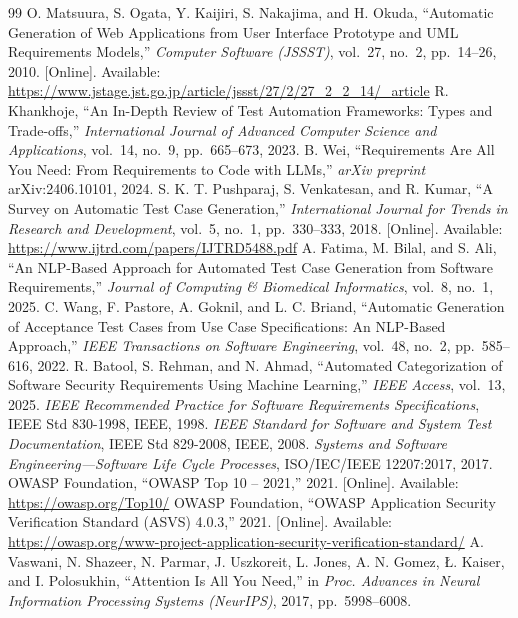 \documentclass[12pt,a4paper,oneside]{report}
\begin{document}
\begin{thebibliography}{99}
 O. Matsuura, S. Ogata, Y. Kaijiri, S. Nakajima, and H. Okuda, ``Automatic Generation of Web Applications from User Interface Prototype and UML Requirements Models,'' \emph{Computer Software (JSSST)}, vol.~27, no.~2, pp.~14--26, 2010. [Online]. Available: \url{https://www.jstage.jst.go.jp/article/jssst/27/2/27_2_2_14/_article}
 R. Khankhoje, ``An In-Depth Review of Test Automation Frameworks: Types and Trade-offs,'' \emph{International Journal of Advanced Computer Science and Applications}, vol.~14, no.~9, pp.~665--673, 2023.
 B. Wei, ``Requirements Are All You Need: From Requirements to Code with LLMs,'' \emph{arXiv preprint} arXiv:2406.10101, 2024.
 S. K. T. Pushparaj, S. Venkatesan, and R. Kumar, ``A Survey on Automatic Test Case Generation,'' \emph{International Journal for Trends in Research and Development}, vol.~5, no.~1, pp.~330--333, 2018. [Online]. Available: \url{https://www.ijtrd.com/papers/IJTRD5488.pdf}
 A. Fatima, M. Bilal, and S. Ali, ``An NLP-Based Approach for Automated Test Case Generation from Software Requirements,'' \emph{Journal of Computing \& Biomedical Informatics}, vol.~8, no.~1, 2025.
 C. Wang, F. Pastore, A. Goknil, and L. C. Briand, ``Automatic Generation of Acceptance Test Cases from Use Case Specifications: An NLP-Based Approach,'' \emph{IEEE Transactions on Software Engineering}, vol.~48, no.~2, pp.~585--616, 2022.
 R. Batool, S. Rehman, and N. Ahmad, ``Automated Categorization of Software Security Requirements Using Machine Learning,'' \emph{IEEE Access}, vol.~13, 2025.
 \emph{IEEE Recommended Practice for Software Requirements Specifications}, IEEE Std 830-1998, IEEE, 1998.
 \emph{IEEE Standard for Software and System Test Documentation}, IEEE Std 829-2008, IEEE, 2008.
 \emph{Systems and Software Engineering---Software Life Cycle Processes}, ISO/IEC/IEEE 12207:2017, 2017.
 OWASP Foundation, ``OWASP Top 10 -- 2021,'' 2021. [Online]. Available: \url{https://owasp.org/Top10/}
 OWASP Foundation, ``OWASP Application Security Verification Standard (ASVS) 4.0.3,'' 2021. [Online]. Available: \url{https://owasp.org/www-project-application-security-verification-standard/}
 A. Vaswani, N. Shazeer, N. Parmar, J. Uszkoreit, L. Jones, A. N. Gomez, {\L}. Kaiser, and I. Polosukhin, ``Attention Is All You Need,'' in \emph{Proc. Advances in Neural Information Processing Systems (NeurIPS)}, 2017, pp.~5998--6008.

\end{thebibliography}
\end{document}
